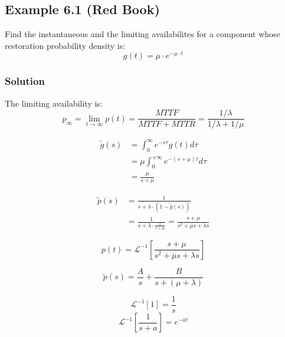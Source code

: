 \subsection{Example 6.1 (Red Book)}
Find the instantaneous and the limiting availabilites for a component whose
restoration probability density is:
\begin{equation*}
    g(t) = \mu \cdot e^{-\mu\cdot t}
\end{equation*}

\subsubsection*{Solution}
The limiting availability is:
\begin{equation*}
    p_\infty = \lim_{t\to\infty}p(t) = \frac{MTTF}{MTTF+MTTR} = \frac{1/\lambda}{1/\lambda + 1/\mu}
\end{equation*}

\begin{equation*}
    \begin{split}
        \tilde{g}(s) &= \int_0^\infty e^{-s\tau} g(t) d\tau \\
        &= \mu\int_0^{+\infty}e^{-(s+\mu)\tau}d\tau\\
        &= \frac{\mu}{s+\mu}
    \end{split}
\end{equation*}

\begin{equation*}
    \begin{split}
        \tilde{p}(s) &= \frac{1}{s+\lambda\cdot(1-\tilde{g}(s))}\\
        &= \frac{1}{s+\lambda\cdot\frac{s}{s+\mu}} = \frac{s+\mu}{s^2+\mu s+\lambda s}
    \end{split}
\end{equation*}

\begin{equation*}
    p(t) = \mathcal{L}^{-1}\left[\frac{s+\mu}{s^2+\mu s+\lambda s}\right]
\end{equation*}

\begin{equation*}
    \tilde{p}(s)= \frac{A}{s} + \frac{B}{s+(\mu+\lambda)}
\end{equation*}

\begin{equation*}
    \mathcal{L}^{-1}[1] = \frac{1}{s}
\end{equation*}
\begin{equation*}
    \mathcal{L}^{-1}\left[\frac{1}{s+a}\right] = e^{-at}
\end{equation*}

